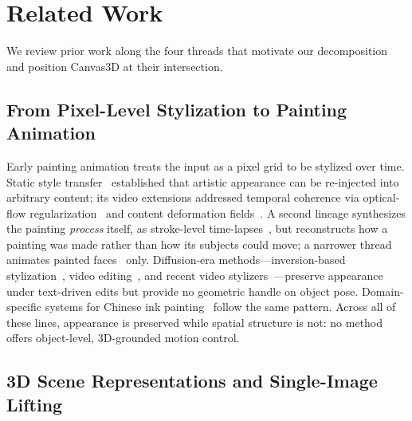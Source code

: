 \section{Related Work}
\label{sec:related}

We review prior work along the four threads that motivate our
decomposition and position Canvas3D at their intersection.

\subsection{From Pixel-Level Stylization to Painting Animation}

Early painting animation treats the input as a pixel grid to be
stylized over time. Static style
transfer~\cite{gatys2016image,johnson2016perceptual,huang2017arbitrary,park2019arbitrary,deng2021stytr2}
established that artistic appearance can be re-injected into arbitrary
content; its video extensions addressed temporal coherence via
optical-flow regularization~\cite{ruder2016artistic,chen2017coherent,huang2017realtime,wang2020consistent,deng2021arbitrary}
and content deformation fields~\cite{ouyang2024codef}. A second lineage
synthesizes the painting \emph{process} itself, as stroke-level
time-lapses~\cite{zhao2020painting,zou2021stylized,liu2021neuralstrokes,madono2023data},
but reconstructs how a painting was made rather than how its subjects
could move; a narrower thread animates painted
faces~\cite{guo2024liveportrait,tan2024edtalk} only. Diffusion-era
methods---inversion-based
stylization~\cite{zhang2023inversion,chen2024artadapter}, video
editing~\cite{ceylan2023pix2video,chai2023stablevideo,geyer2024tokenflow,liang2024flowvid},
and recent video stylizers~\cite{ye2025stylemaster,li2026echostyle,jones2026refvfx}---preserve
appearance under text-driven edits but provide no geometric handle on
object pose. Domain-specific systems for Chinese ink
painting~\cite{liang2021instance,he2023bitgan,liu2026chipdiff,zhang2025inkspirit}
follow the same pattern. Across all of these lines, appearance is
preserved while spatial structure is not: no method offers
object-level, 3D-grounded motion control.

\subsection{3D Scene Representations and Single-Image Lifting}

